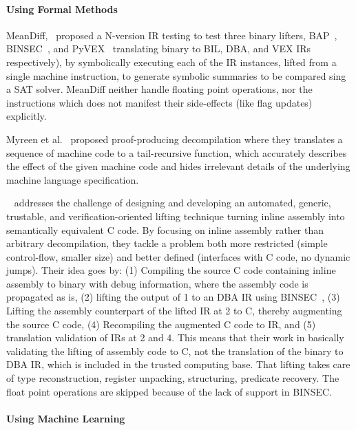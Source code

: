 \paragraph{Using Formal Methods}

MeanDiff,~\cite{ASE2017} proposed a N-version IR testing to test three binary
lifters, BAP~\cite{BAP:CAV11}, BINSEC~\cite{BINSEC2011}, and PyVEX~\cite{PYVEX}
translating binary to BIL, DBA, and VEX IRs respectively), by symbolically
executing each of the IR instances, lifted from a single machine instruction,
          to generate symbolic summaries to be compared sing a SAT solver.
          MeanDiff neither handle floating point operations, nor the
          instructions which does not manifest their side-effects (like flag
              updates) explicitly.

Myreen et al.~\cite{Myreen:FMCAD:2008,Myreen:FMCAD:2012} proposed
proof-producing decompilation where they translates a sequence of machine code
to a tail-recursive function, which accurately describes the effect of the
given machine code and hides irrelevant details of the underlying machine
language specification.

~\cite{inlineassm} addresses the challenge of designing and developing an
automated, generic, trustable, and verification-oriented lifting technique
turning inline assembly into semantically equivalent C code. By focusing on
inline assembly rather than arbitrary decompilation, they tackle a problem both
more restricted (simple control-flow, smaller size) and better defined
(interfaces with C code, no dynamic jumps). Their idea goes by: (1) Compiling
the source C code containing inline assembly to binary with debug information,
    where the assembly code is propagated as is, (2) lifting the output of 1 to
    an DBA IR using BINSEC~\cite{BINSEC2011}, (3) Lifting the assembly
    counterpart of the lifted IR at 2 to C, thereby augmenting the  source C
    code, (4) Recompiling the augmented C code to IR, and (5) translation
    validation of IRs at 2 and 4. This means that their work in basically
    validating the lifting of assembly code to C, not the translation of the
    binary to DBA IR, which is included in the trusted computing base. That
    lifting takes care of type reconstruction, register unpacking, structuring,
    predicate recovery. The float point operations are skipped because of the
    lack of support in BINSEC.   

\paragraph{Using Machine Learning}

